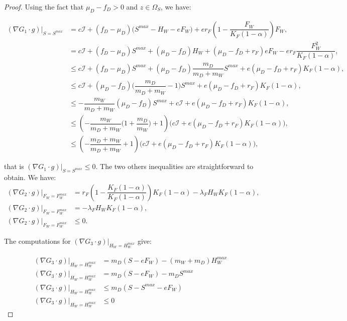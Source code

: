 \documentclass{article}
\newcommand{\lfw}{\lambda_{F}}
\newcommand{\lfw}{\lambda_{F}}
\newcommand{\cI}{c \mathcal{I}}
\begin{document}
\begin{proof}
Using the fact that $\mu_D - f_D >0$ and $z\in \Omega_S$, we have:

\begin{align*}
(\nabla G_1 \cdot g)|_{S = S^{max}} &= \cI + (f_D - \mu_D) \Big(S^{max} - H_W - eF_W \Big) + e r_F \left(1 - \dfrac{F_W}{K_F(1-\alpha)} \right) F_W, \\
&= \cI + (f_D - \mu_D) S^{max} + (\mu_D - f_D) H_W + (\mu_D - f_D + r_F)eF_W - e r_F \dfrac{F_W^2}{K_F(1-\alpha)}, \\
&\leq  \cI + (f_D - \mu_D) S^{max} +(\mu_D - f_D) \dfrac{m_D}{m_D + m_W} S^{max} +e (\mu_D - f_D + r_F) K_F(1-\alpha), \\
&\leq  \cI + (\mu_D - f_D)\big(\dfrac{m_D}{m_D + m_W} - 1\Big)S^{max} +e (\mu_D - f_D + r_F) K_F(1-\alpha), \\
&\leq  - \dfrac{m_W}{m_D + m_W}(\mu_D - f_D)S^{max} +\cI +e (\mu_D - f_D + r_F) K_F(1-\alpha), \\
&\leq \left(-\dfrac{m_W}{m_D + m_W} \Big(1+ \dfrac{m_D}{m_W}\Big) + 1 \right) \Big(\cI +e (\mu_D - f_D + r_F) K_F(1-\alpha)\Big),\\
&\leq \left(-\dfrac{m_D + m_W}{m_D + m_W} + 1 \right) \Big(\cI +e (\mu_D - f_D + r_F) K_F(1-\alpha)\Big),
\end{align*}

that is $(\nabla G_1 \cdot g)|_{S = S^{max}} \leq 0$. The two others inequalities are straightforward to obtain. We have:
\begin{align*}
(\nabla G_2 \cdot g)|_{F_W = F_W^{max}} &= r_F  \left(1 - \dfrac{K_F (1-\alpha)}{K_F (1-\alpha)}\right)K_F (1-\alpha)  - \lfw H_W K_F (1-\alpha), \\
(\nabla G_2 \cdot g)|_{F_W = F_W^{max}} & = - \lfw H_W K_F (1-\alpha), \\
(\nabla G_2 \cdot g)|_{F_W = F_W^{max}} & \leq 0.
\end{align*}

The computations for $(\nabla G_3 \cdot g)|_{H_W = H_W^{max}}$ give:

\begin{align*}
(\nabla G_3 \cdot g)|_{H_W = H_W^{max}} &= m_D (S - eF_W) - (m_W + m_D) H_W^{max} \\
(\nabla G_3 \cdot g)|_{H_W = H_W^{max}} &= m_D (S - eF_W) - m_D S^{max} \\
(\nabla G_3 \cdot g)|_{H_W = H_W^{max}} & \leq m_D (S - S^{max} -  eF_W) \\
(\nabla G_3 \cdot g)|_{H_W = H_W^{max}} & \leq 0
\end{align*}


\end{proof}
\end{document}
